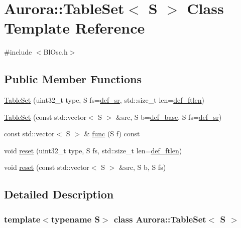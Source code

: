 \hypertarget{class_aurora_1_1_table_set}{}\section{Aurora\+:\+:Table\+Set$<$ S $>$ Class Template Reference}
\label{class_aurora_1_1_table_set}


{\ttfamily \#include $<$Bl\+Osc.\+h$>$}

\subsection*{Public Member Functions}
\begin{DoxyCompactItemize}
\item 
\hyperlink{class_aurora_1_1_table_set_a0be4528b972606335d73ac312da6337b}{Table\+Set} (uint32\+\_\+t type, S fs=\hyperlink{namespace_aurora_ad49263d809bea98dd422e95bc91bc03e}{def\+\_\+sr}, std\+::size\+\_\+t len=\hyperlink{namespace_aurora_a14dabfd9feedfa09c0e6f86d2627f006}{def\+\_\+ftlen})
\item 
\hyperlink{class_aurora_1_1_table_set_a884ecfde480fdac4c32fa10a82286941}{Table\+Set} (const std\+::vector$<$ S $>$ \&src, S b=\hyperlink{namespace_aurora_acb267dff62f74484893c2d5b679b78bf}{def\+\_\+base}, S fs=\hyperlink{namespace_aurora_ad49263d809bea98dd422e95bc91bc03e}{def\+\_\+sr})
\item 
const std\+::vector$<$ S $>$ \& \hyperlink{class_aurora_1_1_table_set_afd4c6f1ba81f6ae1feb42eabd95c1b7f}{func} (S f) const
\item 
void \hyperlink{class_aurora_1_1_table_set_ac2c945c49d53f60fd909dc771a6ff7e5}{reset} (uint32\+\_\+t type, S fs, std\+::size\+\_\+t len=\hyperlink{namespace_aurora_a14dabfd9feedfa09c0e6f86d2627f006}{def\+\_\+ftlen})
\item 
void \hyperlink{class_aurora_1_1_table_set_afec852dca45285ec57b6a4a97dffac36}{reset} (const std\+::vector$<$ S $>$ \&src, S b, S fs)
\end{DoxyCompactItemize}


\subsection{Detailed Description}
\subsubsection*{template$<$typename S$>$\newline
class Aurora\+::\+Table\+Set$<$ S $>$}


